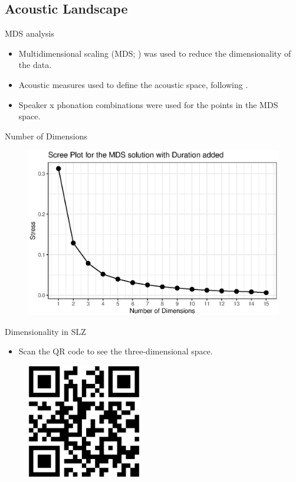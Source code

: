 \documentclass{beamer}
\begin{document}
\subsection{Acoustic Landscape}

\begin{frame}{MDS analysis}
  \begin{itemize}
    \item Multidimensional scaling (MDS; \cite{kruskalMultidimensionalScaling1978}) was used to reduce the dimensionality of the data.
    \item Acoustic measures used to define the acoustic space, following \citet{keatingCrosslanguageAcousticSpace2023}.
    \item Speaker x phonation combinations were used for the points in the MDS space.
  \end{itemize}
\end{frame}

\begin{frame}{Number of Dimensions}
  \begin{figure}[h!]
    \centering
    \includegraphics[width = 0.8\linewidth]{images/MDS/stress_plot_dur.eps}
\end{figure}
\end{frame}

\begin{frame}{Dimensionality in SLZ}
  \begin{itemize}
    \item Scan the QR code to see the three-dimensional space.
  \end{itemize}
  \begin{figure}[h!]
    \centering
    \includegraphics[width=5cm, scale=0.5]{qrcode_3d_plot.eps}
  \end{figure}
\end{frame}
\end{document}
